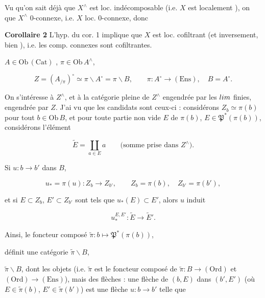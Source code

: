 \documentclass[11pt,a4paper]{article}
\begin{document}
Vu  qu'on sait déjà que  $X^{\wedge}$
est loc. indécomposable (i.e. $X$ est localement ), on
 que $X^{\wedge}$ \ill{} $0$-connexe, i.e. $X$ loc.
$0$-connexe, donc

\textbf{Corollaire 2} L'hyp. du cor. 1 implique que $X$ est loc. cofiltrant
(et inversement, bien \ill{}), i.e. les comp. connexes \ill{} sont cofiltrantes.


$A \in \mathrm{Ob}\,(\mathrm{Cat})$ ,
$\pi \in \mathrm{Ob}\,A^{\wedge}$,

\[
  Z = (A_{/\pi})^{\circ} \simeq \pi\backslash A^{\circ} = \pi\backslash B,
  \qquad \pi : A^{\circ} \longrightarrow (\mathrm{Ens}), \quad B = A^{\circ}.
\]

On s'intéresse à $Z^{\wedge}$, et à la catégorie pleine de
$Z^{\wedge}$ engendrée par les $\varprojlim$ finies, engendrée par \ill{} $Z$.
J'ai vu que les candidats sont ceux-ci : considérons
$Z_{b} \simeq \pi(b)$ pour tout $b \in \mathrm{Ob}\,B$, et pour toute partie non
vide $E$ de $\pi(b)$, $E \in \mathfrak{P}^{*}(\pi(b))$, considérons l'élément

\[
  \widetilde{E} = \coprod_{a \in E} a
  \qquad \text{(somme prise dans } Z^{\wedge}\text{)}.
\]

Si $u : b \longrightarrow b'$ dans $B$, 

\[
  u_{*} = \pi(u) : Z_{b} \longrightarrow Z_{b'},
  \qquad Z_{b} = \pi(b), \quad Z_{b'} = \pi(b'),
\]

et si $E \subset Z_{b}$, $E' \subset Z_{b'}$ sont tels que
$u_{*}(E) \subset E'$, alors $u$ induit

\[
  u^{E,E'}_{*} : \widetilde{E} \longrightarrow \widetilde{E}' .
\]

Ainsi, le foncteur composé
$\widetilde{\pi} : b \longmapsto \mathfrak{P}^{*}(\pi(b))$,


définit une catégorie $\widetilde{\pi}\backslash B$,  \ill{}


$\widetilde{\pi}\backslash B$, dont les objets \ill{} (i.e. $\widetilde{\pi}$
est le foncteur composé de $\widetilde{\pi} : B \to (\mathrm{Ord})$ \ill{} et
$(\mathrm{Ord}) \to (\mathrm{Ens})$), mais \ill{} des flèches : une flèche de
$(b,E)$ dans $(b',E')$ (où $E \in \widetilde{\pi}(b)$,
$E' \in \widetilde{\pi}(b')$) est une flèche $u : b \to b'$ telle que
\end{document}
